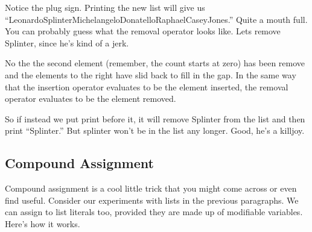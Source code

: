 \begin{SSCodeBox}
\scitea{TeenageMutantNinjaTurtles+[}
\scitea{] = }
\scitea{;}
\end{SSCodeBox}

Notice the plug sign.  Printing the new list will give us ``LeonardoSplinterMichelangeloDonatelloRaphaelCaseyJones.''  Quite a mouth full.  You can probably guess what the removal operator looks like.  Lets remove Splinter, since he's kind of a jerk.

\begin{SSCodeBox}
\scitea{TeenageMutantNinjaTurtles-[}
\scitea{];}
\end{SSCodeBox}

No the the second element (remember, the count starts at zero) has been remove and the elements to the right have slid back to fill in the gap.  In the same way that the insertion operator evaluates to be the element inserted, the removal operator evaluates to be the element removed.

\begin{SSCodeBox}
\scitea{ TeenageMutantNinjaTurtles-[}
\scitea{];}
\end{SSCodeBox}

So if instead we put print before it, it will remove Splinter from the list and then print ``Splinter.''  But splinter won't be in the list any longer.  Good, he's a killjoy.

\subsection{Compound Assignment}

Compound assignment is a cool little trick that you might come across or even find useful.  Consider our experiments with lists in the previous paragraphs.  We can assign to list literals too, provided they are made up of modifiable variables.  Here's how it works.

\begin{SSCodeBox}
 \\
 \\
 \\
 \\
\scitea{} \\
 \\
 \\
\scitea{} \\
\end{SSCodeBox}

